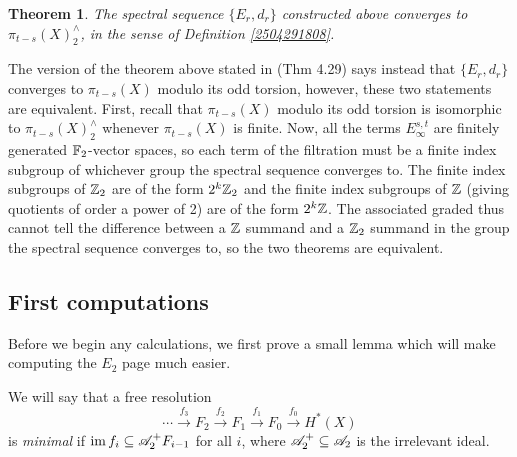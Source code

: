 \documentclass[11pt, titlepage]{article} %
\def\bb{\ensuremath\mathbb}
\def\subq{\ensuremath\subseteq}
\def\inte{\ensuremath\mathbb{Z}}
\def\A{\ensuremath{\mathscr{A}_2}}
\DeclareMathOperator{\im}{im}
\numberwithin{equation}{subsection}
\theoremstyle{plain}
\newtheorem{theorem}{Theorem}[subsection]
\theoremstyle{definition}
\begin{document}
\begin{theorem}\label{2504081125}
The spectral sequence \(\{E_r, d_r\}\) constructed above converges to \(\pi_{t-s}(X)^\wedge_2\), in the sense of Definition \ref{2504291808}. 
\end{theorem}

The version of the theorem above stated in \autocite{hatcher5} (Thm 4.29) says instead that \(\{E_r, d_r\}\) converges to \(\pi_{t-s}(X)\) modulo its odd torsion, however, these two statements are equivalent. First, recall that \(\pi_{t-s}(X)\) modulo its odd torsion is isomorphic to \(\pi_{t-s}(X)^\wedge_2\) whenever \(\pi_{t-s}(X)\) is finite. Now, all the terms \(E_\infty^{s,t}\) are finitely generated \(\bb{F}_2\)-vector spaces, so each term of the filtration must be a finite index subgroup of whichever group the spectral sequence converges to. The finite index subgroups of \(\inte_2\) are of the form \(2^k\inte_2\) 
and the finite index subgroups of \(\inte\) (giving quotients of order a power of 2) are of the form \(2^k\inte\). The associated graded thus cannot tell the difference between a \(\inte\) summand and a \(\inte_2\) summand in the group the spectral sequence converges to, so the two theorems are equivalent.


\subsection{First computations}\label{2504291249}

Before we begin any calculations, we first prove a small lemma which will make computing the \(E_2\) page much easier. 

We will say that a free resolution
\[\cdots \xrightarrow{f_3} F_2 \xrightarrow{f_2} F_1 \xrightarrow{f_1} F_0 \xrightarrow{f_0} H^*(X)\]
is \textit{minimal} if \(\im f_i \subq \A^+F_{i-1}\) for all \(i\), where \(\A^+\subq \A\) is the irrelevant ideal. 
\end{document}
